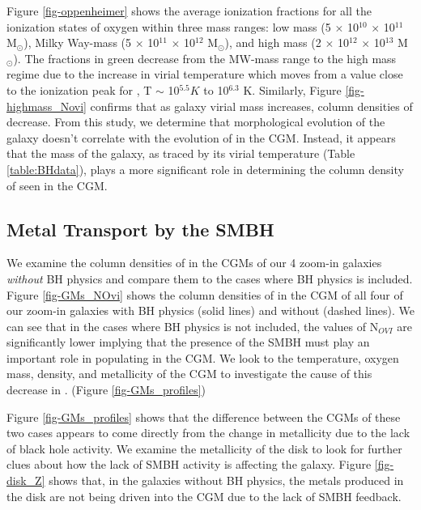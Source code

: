 \documentclass[]{emulateapj}
\begin{document}
Figure \ref{fig-oppenheimer} shows the average ionization fractions for all the ionization states of oxygen within three mass ranges: low mass (5 $\times$ 10$^{10}$  $\times$ 10$^{11}$ M$_{\odot}$), Milky Way-mass (5 $\times$ 10$^{11}$  $\times$ 10$^{12}$ M$_{\odot}$), and high mass (2 $\times$ 10$^{12}$  $\times$ 10$^{13}$ M$_{\odot}$). The  fractions in green decrease from the MW-mass range to the high mass regime due to the increase in virial temperature which moves from a value close to the ionization peak for , T $\sim$ 10$^{5.5} K$ to 10$^{6.3}$ K. Similarly, Figure \ref{fig-highmass_Novi} confirms that as galaxy virial mass increases, column densities of  decrease. From this study, we determine that morphological evolution of the galaxy doesn't correlate with the evolution of  in the CGM. Instead, it appears that the mass of the galaxy, as traced by its virial temperature (Table \ref{table:BHdata}), plays a more significant role in determining the column density of  seen in the CGM.

\subsection{Metal Transport by the SMBH}
\label{Result:metalsbyBH}

We examine the column densities of  in the CGMs of our 4 zoom-in galaxies \textit{without} BH physics and compare them to the cases where BH physics is included. Figure \ref{fig-GMs_NOvi} shows the column densities of  in the CGM of all four of our zoom-in galaxies with BH physics (solid lines) and without (dashed lines). We can see that in the cases where BH physics is not included, the values of N$_{OVI}$ are significantly lower implying that the presence of the SMBH must play an important role in populating  in the CGM. We look to the temperature, oxygen mass, density, and metallicity of the CGM to investigate the cause of this decrease in . (Figure \ref{fig-GMs_profiles})

Figure \ref{fig-GMs_profiles} shows that the difference between the CGMs of these two cases appears to come directly from the change in metallicity due to the lack of black hole activity. We examine the metallicity of the disk to look for further clues about how the lack of SMBH activity is affecting the galaxy. Figure \ref{fig-disk_Z} shows that, in the galaxies without BH physics, the metals produced in the disk are not being driven into the CGM due to the lack of SMBH feedback. 
\end{document}
